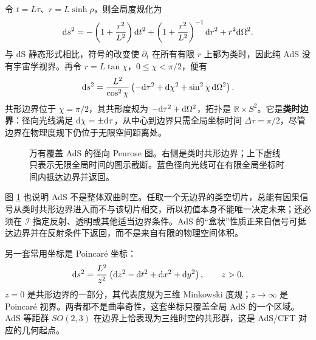 令 $t=L\tau$、$r=L\sinh\rho$，则全局度规化为
\begin{equation}\label{eq:AdS-global-static}
    \dd s^2=-\left(1+\frac{r^2}{L^2}\right)\dd t^2
      +\left(1+\frac{r^2}{L^2}\right)^{-1}\dd r^2+r^2\dd\Omega^2.
\end{equation}
与 dS 静态形式相比，符号的改变使 $\partial_t$ 在所有有限 $r$ 上都为类时，因此纯 AdS 没有宇宙学视界。再令 $r=L\tan\chi$，$0\leqslant\chi<\pi/2$，便有
\begin{equation}\label{eq:AdS-conformal}
    \dd s^2=\frac{L^2}{\cos^2\chi}
      \left(-\dd\tau^2+\dd\chi^2+\sin^2\chi\,\dd\Omega^2\right).
\end{equation}
共形边界位于 $\chi=\pi/2$，其共形度规为 $-\dd\tau^2+\dd\Omega^2$，拓扑是 $\mathbb R\times S^2$。它是\textbf{类时边界}：径向光线满足 $\dd\chi=\pm\dd\tau$，从中心到边界只需全局坐标时间 $\Delta\tau=\pi/2$，尽管边界在物理度规下仍位于无限空间距离处。

\begin{figure}[htbp]
    \centering
    \caption{万有覆盖 AdS 的径向 Penrose 图。右侧是类时共形边界；上下虚线只表示无限全局时间的图示截断。蓝色径向光线可在有限全局坐标时间内抵达边界并返回。}
    \label{fig:AdS-penrose}
\end{figure}

图 \ref{fig:AdS-penrose} 也说明 AdS 不是整体双曲时空。任取一个无边界的类空切片，总能有因果信号从类时共形边界进入而不与该切片相交，所以初值本身不能唯一决定未来；还必须在 $\mathscr I$ 指定反射、透明或其他适当边界条件。AdS 的“盒状”性质正来自信号可抵达边界并在反射条件下返回，而不是来自有限的物理空间体积。

另一套常用坐标是 Poincar\'e 坐标：
\begin{equation}\label{eq:AdS-poincare}
    \dd s^2=\frac{L^2}{z^2}
      \left(\dd z^2-\dd t^2+\dd x^2+\dd y^2\right),
    \qquad z>0.
\end{equation}
$z=0$ 是共形边界的一部分，其代表度规为三维 Minkowski 度规；$z\to\infty$ 是 Poincar\'e 视界。两者都不是曲率奇性，这套坐标只覆盖全局 AdS 的一个区域。AdS 等距群 $SO(2,3)$ 在边界上恰表现为三维时空的共形群，这是 AdS/CFT 对应的几何起点。


